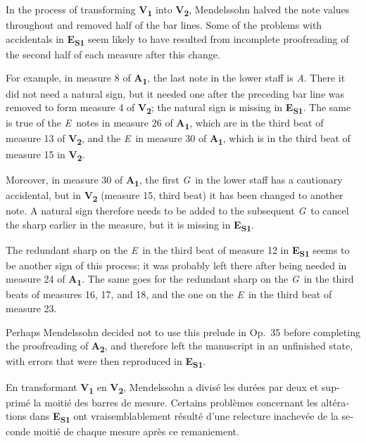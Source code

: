 \documentclass[a4paper, 12pt]{book}
\newcommand{\source}[2]{\textbf{#1\textsubscript{#2}}}
\newcommand{\bigdot}[0]{{\Large \textbullet}}
\newcommand{\centerbigdot}[0]{\begin{center}\bigdot\end{center}}
\begin{document}
{    In the process of transforming \source{V}{1} into \source{V}{2},
    Mendelssohn halved the note values throughout and removed half of
    the bar lines. Some of the problems with accidentals in
    \source{E}{S1} seem likely to have resulted from incomplete
    proofreading of the second half of each measure after this change.

    For example, in measure 8 of \source{A}{1}, the last note in the
    lower staff is \textit{A}\na. There it did not need a natural
    sign, but it needed one after the preceding bar line was removed
    to form measure 4 of \source{V}{2}; the natural sign is missing in
    \source{E}{S1}. The same is true of the \textit{E}\na\ notes in
    measure 26 of \source{A}{1}, which are in the third beat of
    measure 13 of \source{V}{2}, and the \textit{E}\na\ in measure 30
    of \source{A}{1}, which is in the third beat of measure 15 in
    \source{V}{2}.
    
    Moreover, in measure 30 of \source{A}{1}, the first
    \textit{G}\na\ in the lower staff has a cautionary accidental, but
    in \source{V}{2} (measure 15, third beat) it has been changed to
    another note. A natural sign therefore needs to be added to the
    subsequent \textit{G}\na\ to cancel the sharp earlier in the
    measure, but it is missing in \source{E}{S1}.

    The redundant sharp on the \textit{E}\sh\ in the third beat of
    measure 12 in \source{E}{S1} seems to be another sign of this
    process; it was probably left there after being needed in measure
    24 of \source{A}{1}. The same goes for the redundant sharp on the
    \textit{G}\sh\ in the third beats of measures 16, 17, and 18, and
    the one on the \textit{E}\sh\ in the third beat of measure 23.

    Perhaps Mendelssohn decided not to use this prelude in Op.\ 35
    before completing the proofreading of \source{A}{2}, and therefore
    left the manuscript in an unfinished state, with errors that were
    then reproduced in \source{E}{S1}.

    \centerbigdot

    \begin{otherlanguage}{french}
    En transformant \source{V}{1} en \source{V}{2}, Mendelssohn a
    divisé les durées par deux et supprimé la moitié des barres de
    mesure. Certains problèmes concernant les altérations dans
    \source{E}{S1} ont vraisemblablement résulté d'une relecture
    inachevée de la seconde moitié de chaque mesure après ce
    remaniement.


\end{otherlanguage}}
\end{document}
